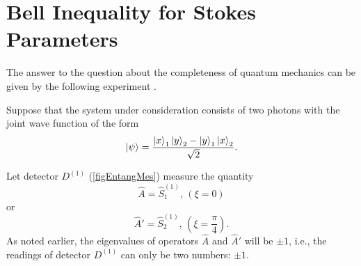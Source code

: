 \section{Bell Inequality for Stokes Parameters}
\label{pPart3EntangleBell}
The answer to the question about the completeness of quantum mechanics can be given by the following experiment \cite{bBell, bPhisQuantInfo, PhysRevLett.28.938}.

Suppose that the system under consideration consists of two photons with the joint wave function of the form
\begin{equation}
\left|\psi\right> = \frac{
\ket{x}_1\ket{y}_2 -
\ket{y}_1\ket{x}_2
}{\sqrt{2}}.
\label{eqBellInequalityState}
\end{equation}

Let detector $D^{(1)}$ (\autoref{figEntangMes}) measure the quantity 
\[
\hat{A} = \hat{S}_1^{(1)}, \, (\xi = 0)
\] 
or
\[
\hat{A}' = \hat{S}_2^{(1)},\,(\xi =\frac{\pi}{4}).
\]
As noted earlier, the eigenvalues of operators $\hat{A}$ and
$\hat{A}'$ will be $\pm 1$, i.e., the readings of detector $D^{(1)}$ can
only be two numbers: $\pm 1$.

